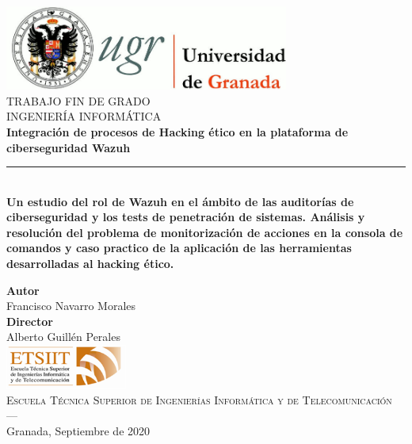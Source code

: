 \begin{titlepage}
 
 
\newlength{\centeroffset}
\setlength{\centeroffset}{-0.5\oddsidemargin}
\addtolength{\centeroffset}{0.5\evensidemargin}
\thispagestyle{empty}

\noindent\hspace*{\centeroffset}\begin{minipage}{\textwidth}

\centering
\includegraphics[width=0.7\textwidth]{imagenes/logo_ugr.jpg}\\[1.4cm]

\textsc{ \Large TRABAJO FIN DE GRADO\\[0.1cm]}
\textsc{ INGENIERÍA INFORMÁTICA}\\[0.6cm]
% 
{\Huge\bfseries Integración de procesos de Hacking ético en la plataforma de ciberseguridad Wazuh \\
}
\noindent\rule[-1ex]{\textwidth}{3pt}\\[3.5ex]
{\large\bfseries Un estudio del rol de Wazuh en el ámbito de las auditorías de ciberseguridad y los tests de penetración de sistemas. Análisis y resolución del problema de monitorización de acciones en la consola de comandos y caso practico de la aplicación de las herramientas desarrolladas al hacking ético.}
\end{minipage}

\vspace{1.5cm}
\noindent\hspace*{\centeroffset}\begin{minipage}{\textwidth}
\centering

\textbf{Autor}\\ {Francisco Navarro Morales}\\[2.5ex]
\textbf{Director}\\
{Alberto Guillén Perales\\}
\includegraphics[width=0.3\textwidth]{imagenes/etsiit_logo.png}\\[0.1cm]
\textsc{Escuela Técnica Superior de Ingenierías Informática y de Telecomunicación}\\
\textsc{---}\\
Granada, Septiembre de 2020
\end{minipage}
\end{titlepage}



